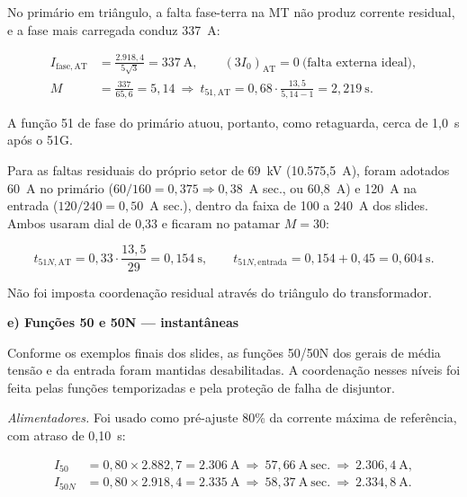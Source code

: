 No primário em triângulo, a falta fase-terra na MT não produz corrente residual, e a fase mais carregada conduz 337~A:

\begin{equation}
    \begin{aligned}
        I_{\mathrm{fase,AT}}&=\frac{2.918{,}4}{5\sqrt{3}}=337~\mathrm{A},
        \qquad (3I_0)_{\mathrm{AT}}=0~\text{(falta externa ideal)},\\
        M&=\frac{337}{65{,}6}=5{,}14
        \ \Rightarrow\ t_{51,\mathrm{AT}}=0{,}68\cdot\frac{13{,}5}{5{,}14-1}=2{,}219~\mathrm{s}.
    \end{aligned}
    \label{eq:oc_terra_delta}
\end{equation}

A função 51 de fase do primário atuou, portanto, como retaguarda, cerca de 1,0~s após o 51G.

Para as faltas residuais do próprio setor de 69~kV (10.575,5~A), foram adotados 60~A no primário ($60/160=0{,}375\Rightarrow0{,}38$~A sec., ou 60,8~A) e 120~A na entrada ($120/240=0{,}50$~A sec.), dentro da faixa de 100 a 240~A dos slides. Ambos usaram dial de 0,33 e ficaram no patamar $M=30$:

\begin{equation}
    t_{51N,\mathrm{AT}}=0{,}33\cdot\frac{13{,}5}{29}=0{,}154~\mathrm{s},
    \qquad
    t_{51N,\mathrm{entrada}}=0{,}154+0{,}45=0{,}604~\mathrm{s}.
    \label{eq:oc_neutro_at_memoria}
\end{equation}

Não foi imposta coordenação residual através do triângulo do transformador.

\textbf{e) Funções 50 e 50N — instantâneas}

Conforme os exemplos finais dos slides, as funções 50/50N dos gerais de média tensão e da entrada foram mantidas desabilitadas. A coordenação nesses níveis foi feita pelas funções temporizadas e pela proteção de falha de disjuntor.

\textit{Alimentadores.} Foi usado como pré-ajuste 80\% da corrente máxima de referência, com atraso de 0,10~s:

\begin{equation}
    \begin{aligned}
        I_{50}&=0{,}80\times2.882{,}7=2.306~\mathrm{A}
            \ \Rightarrow\ 57{,}66~\mathrm{A~sec.}
            \ \Rightarrow\ 2.306{,}4~\mathrm{A},\\
        I_{50N}&=0{,}80\times2.918{,}4=2.335~\mathrm{A}
            \ \Rightarrow\ 58{,}37~\mathrm{A~sec.}
            \ \Rightarrow\ 2.334{,}8~\mathrm{A}.
    \end{aligned}
    \label{eq:oc_50_mt}
\end{equation}

